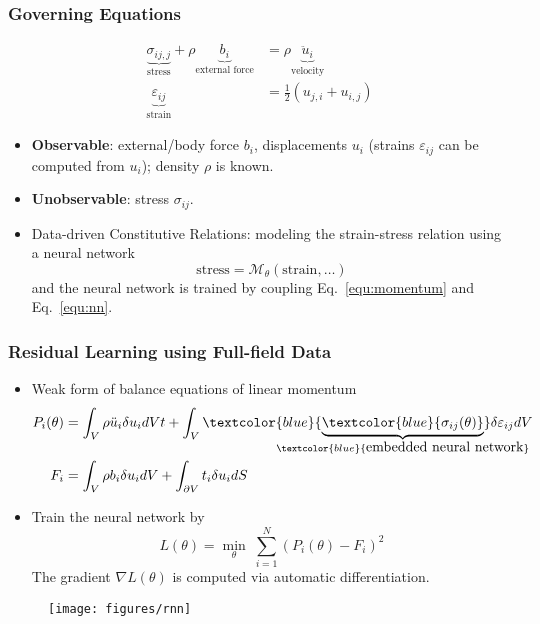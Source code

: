\documentclass[usenames,dvipsnames]{beamer}
\begin{document}
\begin{frame}
	\frametitle{Governing Equations}
	
	\begin{equation}\label{equ:momentum}
		\begin{aligned}
			\underbrace{\sigma_{ij,j}}_{\mbox{stress}} + \rho \underbrace{b_i}_{\mbox{external force}} &= \rho \underbrace{\ddot u_i}_{\mbox{velocity}}\\
			\underbrace{\varepsilon_{ij}}_{\mbox{strain}} &= \frac{1}{2}(u_{j,i}+u_{i,j})
		\end{aligned}
	\end{equation}
	
	
	\begin{itemize}
		\item \textbf{Observable}: external/body force $b_i$, displacements $u_i$ (strains $\varepsilon_{ij}$ can be computed from $u_i$); density $\rho$ is known.  
		\item \textbf{Unobservable}: stress $\sigma_{ij}$. 
		\item Data-driven Constitutive Relations: modeling the strain-stress relation using a neural network
		\begin{equation}\label{equ:nn}
			\boxed{\mbox{stress} =\mathcal{M}_{\theta}(\mbox{strain},\ldots)}
		\end{equation}
		and the neural network is trained by coupling Eq.~\ref{equ:momentum} and Eq.~\ref{equ:nn}.
	\end{itemize}
	
	
\end{frame}

\begin{frame}
	\frametitle{Residual Learning using Full-field Data}
	\begin{itemize}
		\item Weak form of balance equations of linear momentum 
		{\footnotesize
			\begin{align*}
				P_i(\theta) &= \int_V \rho \ddot u_i \delta u_i dVt + \int_{V} \textcolor{blue}{\underbrace{\textcolor{blue}{\sigma_{ij}(\theta)}}_{\mathclap{\textcolor{blue}{\mbox{embedded neural network}}}}} \delta \varepsilon_{ij}dV\\
				F_i &= \int_{V}\rho b_i \delta u_i dV + \int_{\partial V} t_i\delta u_idS
			\end{align*}
		}
		\item Train the neural network by 
		{\scriptsize $$\boxed{L(\theta) = \min_{\theta}\;\sum_{i=1}^N(P_i(\theta) - F_i)^2}$$}
		The gradient $\nabla L(\theta)$ is computed via automatic differentiation.
	\end{itemize}
	\begin{figure}[hbt]
		\texttt{[image: figures/rnn]}
	\end{figure}
	
\end{frame}
\end{document}
